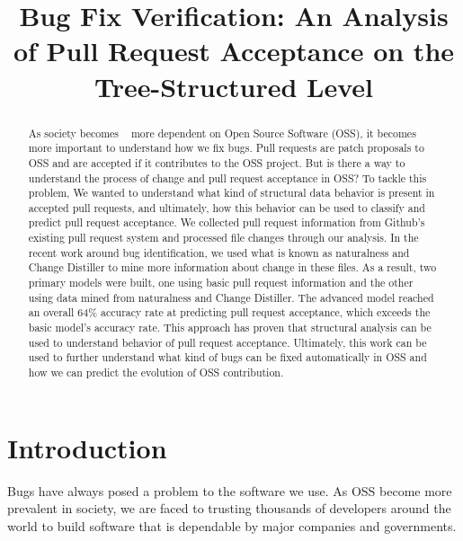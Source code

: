 \documentclass[10pt, conference]{IEEEtran}
\begin{document}
%
\title{Bug Fix Verification: An Analysis of Pull Request Acceptance on the Tree-Structured Level}



\author{
}
\maketitle


\begin{abstract}
As society becomes ~\cite{Yu} more dependent on Open Source Software (OSS), it becomes more important to understand how we fix bugs. Pull requests are patch proposals to OSS and are accepted if it contributes to the OSS project. But is there a way to understand the process of change and pull request acceptance in OSS? To tackle this problem, We wanted to understand what kind of structural data behavior is present in accepted pull requests, and ultimately, how this behavior can be used to classify and predict pull request acceptance. We collected pull request information from Github's existing pull request system and processed file changes through our analysis. In the recent work around bug identification, we used what is known as naturalness and Change Distiller to mine more information about change in these files. As a result, two primary models were built, one using basic pull request information and the other using data mined from naturalness and Change Distiller. The advanced model reached an overall 64\% accuracy rate at predicting pull request acceptance, which exceeds the basic model's accuracy rate. This approach has proven that structural analysis can be used to understand behavior of pull request acceptance. Ultimately, this work can be used to further understand what kind of bugs can be fixed automatically in OSS and how we can predict the evolution of OSS contribution.
\end{abstract}
\IEEEpeerreviewmaketitle

\section{Introduction}
Bugs have always posed a problem to the software we use. As OSS become more prevalent in society, we are faced to trusting thousands of developers around the world to build software that is dependable by major companies and governments. 
\end{document}
